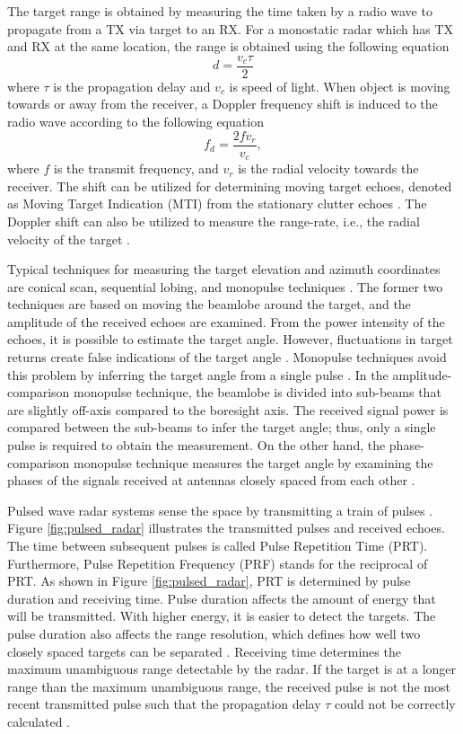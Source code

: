 \documentclass[english, 12pt, a4paper, elec, utf8, a-1b, online]{aaltothesis}
\begin{document}
The target range is obtained by measuring the time taken by a radio wave to propagate from a TX via target to an RX.
For a monostatic radar which has TX and RX at the same location, the range is obtained using the following equation \cite{Curry2011}
\begin{equation}
    d = \frac{ v_c \tau}{2} 
\end{equation}
where $\tau$ is the propagation delay and $v_c$ is speed of light.
When object is moving towards or away from the receiver, a Doppler frequency shift is induced to the radio wave according to the following equation \cite{Curry2011}
\begin{equation}
    f_d = \frac{2 f v_r}{v_c},
\end{equation}
where $f$ is the transmit frequency, and $v_r$ is the radial velocity towards the receiver.
The shift can be utilized for determining moving target echoes, denoted as Moving Target Indication (MTI) from the stationary clutter echoes \cite{Curry2011}.
The Doppler shift can also be utilized to measure the range-rate, i.e., the radial velocity of the target \cite{Curry2011}.

Typical techniques for measuring the target elevation and azimuth coordinates are conical scan, sequential lobing, and monopulse techniques \cite{Sherman2011}. 
The former two techniques are based on moving the beamlobe around the target, and the amplitude of the received echoes are examined. 
From the power intensity of the echoes, it is possible to estimate the target angle.
However, fluctuations in target returns create false indications of the target angle \cite{Sherman2011}.
Monopulse techniques avoid this problem by inferring the target angle from a single pulse \cite{Sherman2011}.
In the amplitude-comparison monopulse technique, the beamlobe is divided into sub-beams that are slightly off-axis compared to the boresight axis.  
The received signal power is compared between the sub-beams to infer the target angle; thus, only a single pulse is required to obtain the measurement.
On the other hand, the phase-comparison monopulse technique measures the target angle by examining the phases of the signals received at antennas closely spaced from each other \cite{Sherman2011}.

Pulsed wave radar systems sense the space by transmitting a train of pulses \cite{Mahafza2015}.
Figure \ref{fig:pulsed_radar} illustrates the transmitted pulses and received echoes.
The time between subsequent pulses is called Pulse Repetition Time (PRT). 
Furthermore, Pulse Repetition Frequency (PRF) stands for the reciprocal of PRT.
As shown in Figure \ref{fig:pulsed_radar}, PRT is determined by pulse duration and receiving time.
Pulse duration affects the amount of energy that will be transmitted.
With higher energy, it is easier to detect the targets.
The pulse duration also affects the range resolution, which defines how well two closely spaced targets can be separated \cite{Curry2011}.
Receiving time determines the maximum unambiguous range detectable by the radar.
If the target is at a longer range than the maximum unambiguous range, the received pulse is not the most recent transmitted pulse such that the propagation delay $\tau$ could not be correctly calculated \cite{Curry2011}.
\end{document}

